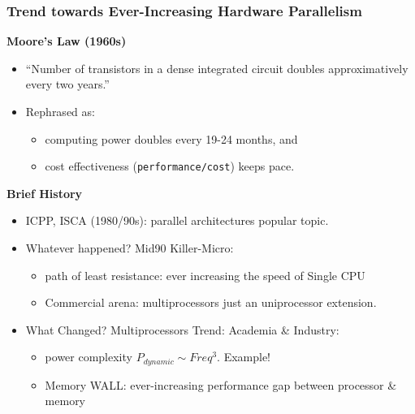 \documentclass{beamer}
\renewcommand{\emph}[1]{\textcolor{structure}{#1}}
\newcommand{\emp}[1]{\textcolor{DikuRed}{ #1}}
\begin{document}
\begin{frame}[fragile,t]
\frametitle{Trend towards Ever-Increasing Hardware Parallelism}

\emp{\bf Moore's Law (1960s)}
\begin{itemize}
        \item ``Number of transistors in a dense integrated circuit doubles approximatively 
                    every two years.''\pause\bigskip
        \item Rephrased as:\medskip
            \begin{itemize}
                \item computing power doubles every 19-24 months, and 
                \item cost effectiveness ({\tt performance/cost}) keeps pace.
            \end{itemize}\bigskip
\end{itemize}

\emp{\bf Brief History}
\begin{itemize}
        \item \emph{ICPP, ISCA (1980/90s): parallel architectures popular topic.}\bigskip

        \item \alert{Whatever happened? Mid90 Killer-Micro:}\pause
        \begin{itemize}
            \item path of least resistance: ever increasing the speed of Single CPU
            \item Commercial arena: multiprocessors just an uniprocessor extension.
        \end  {itemize}\bigskip

        \item \emph{What Changed?} Multiprocessors Trend: Academia \& Industry:
        \begin{itemize}
            \item \emph{power complexity} $P_{dynamic} \sim Freq^3$. \alert{Example!}\pause
            \item \emph{Memory WALL}: ever-increasing performance gap between 
                                        processor \& memory 
        \end  {itemize}\bigskip

\end{itemize}

\end{frame}
\end{document}
